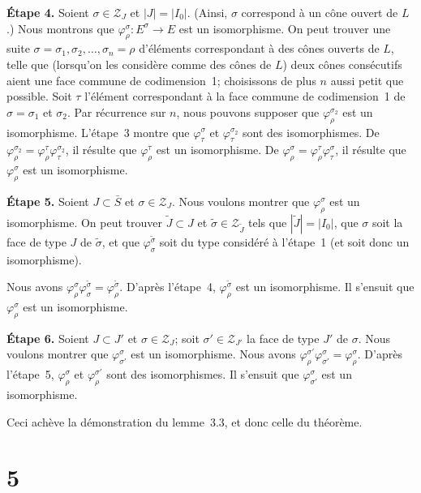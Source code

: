\documentclass[10pt,a4paper]{article}
\theoremstyle{plain}
\theoremstyle{definition}
\theoremstyle{remark}
\newcommand{\cZ}{\mathcal{Z}}
\begin{document}
\smallskip
\noindent\textbf{Étape 4.} Soient $\sigma \in \cZ_J$ et $|J| = |I_0|$. (Ainsi, $\sigma$ correspond à un cône ouvert de $L$.) Nous montrons que $\varphi_\rho^\sigma \colon E^\sigma \to E$ est un isomorphisme. On peut trouver une suite $\sigma = \sigma_1, \sigma_2, \dots, \sigma_n = \rho$ d'éléments correspondant à des cônes ouverts de $L$, telle que (lorsqu'on les considère comme des cônes de $L$) deux cônes consécutifs aient une face commune de codimension~1; choisissons de plus $n$ aussi petit que possible. Soit $\tau$ l'élément correspondant à la face commune de codimension~1 de $\sigma = \sigma_1$ et $\sigma_2$. Par récurrence sur $n$, nous pouvons supposer que $\varphi_\rho^{\sigma_2}$ est un isomorphisme. L'étape~3 montre que $\varphi_\tau^\sigma$ et $\varphi_\tau^{\sigma_2}$ sont des isomorphismes. De $\varphi_\rho^{\sigma_2} = \varphi_\rho^\tau \varphi_\tau^{\sigma_2}$, il résulte que $\varphi_\rho^\tau$ est un isomorphisme. De $\varphi_\rho^\sigma = \varphi_\rho^\tau \varphi_\tau^\sigma$, il résulte que $\varphi_\rho^\sigma$ est un isomorphisme.

\smallskip
\noindent\textbf{Étape 5.} Soient $J \subset \bar S$ et $\sigma \in \cZ_J$. Nous voulons montrer que $\varphi_\rho^\sigma$ est un isomorphisme. On peut trouver $\widetilde J \subset J$ et $\widetilde\sigma \in \cZ_{\widetilde J}$ tels que $|\widetilde J| = |I_0|$, que $\sigma$ soit la face de type $J$ de $\widetilde\sigma$, et que $\varphi_\sigma^{\widetilde\sigma}$ soit du type considéré à l'étape~1 (et soit donc un isomorphisme).

\newpage
\noindent Nous avons $\varphi_\rho^\sigma \varphi_\sigma^{\widetilde\sigma} = \varphi_\rho^{\widetilde\sigma}$. D'après l'étape~4, $\varphi_\rho^{\widetilde\sigma}$ est un isomorphisme. Il s'ensuit que $\varphi_\rho^\sigma$ est un isomorphisme.

\smallskip
\noindent\textbf{Étape 6.} Soient $J \subset J'$ et $\sigma \in \cZ_J$; soit $\sigma' \in \cZ_{J'}$ la face de type $J'$ de $\sigma$. Nous voulons montrer que $\varphi_{\sigma'}^\sigma$ est un isomorphisme. Nous avons $\varphi_\rho^{\sigma'} \varphi_{\sigma'}^\sigma = \varphi_\rho^\sigma$. D'après l'étape~5, $\varphi_\rho^\sigma$ et $\varphi_\rho^{\sigma'}$ sont des isomorphismes. Il s'ensuit que $\varphi_{\sigma'}^\sigma$ est un isomorphisme.

Ceci achève la démonstration du lemme~3.3, et donc celle du théorème.

\section*{5}
\end{document}
